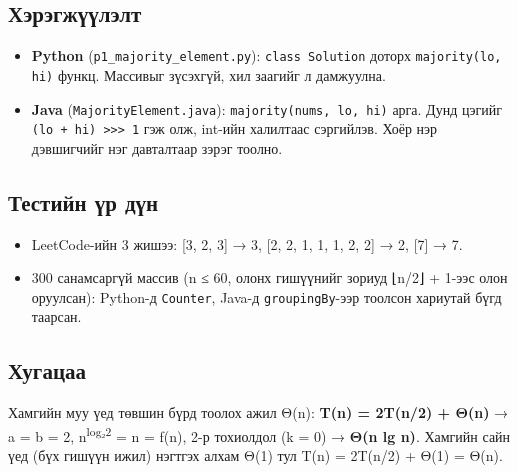 \documentclass[11pt,a4paper]{article}
\begin{document}
\subsection{Хэрэгжүүлэлт}
\begin{itemize}
\item \textbf{Python} (\texttt{p1\_\allowbreak{}majority\_\allowbreak{}element.\allowbreak{}py}): \texttt{class Solution} доторх \texttt{majority(lo, hi)} функц. Массивыг зүсэхгүй, хил заагийг л дамжуулна.
\item \textbf{Java} (\texttt{MajorityElement.\allowbreak{}java}): \texttt{majority(nums, lo, hi)} арга. Дунд цэгийг \texttt{(lo + hi) >>> 1} гэж олж, int-ийн халилтаас сэргийлэв. Хоёр нэр дэвшигчийг нэг давталтаар зэрэг тоолно.
\end{itemize}

\subsection{Тестийн үр дүн}
\begin{itemize}
\item LeetCode-ийн 3 жишээ: [3, 2, 3] → 3, [2, 2, 1, 1, 1, 2, 2] → 2, [7] → 7.
\item 300 санамсаргүй массив (n ≤ 60, олонх гишүүнийг зориуд ⌊n/2⌋ + 1-ээс олон оруулсан): Python-д \texttt{Counter}, Java-д \texttt{groupingBy}-ээр тоолсон хариутай бүгд таарсан.
\end{itemize}

\subsection{Хугацаа}
Хамгийн муу үед төвшин бүрд тоолох ажил Θ(n): \textbf{T(n) = 2T(n/2) + Θ(n)} → a = b = 2, n\textsuperscript{log₂2} = n = f(n), 2-р тохиолдол (k = 0) → \textbf{Θ(n lg n)}. Хамгийн сайн үед (бүх гишүүн ижил) нэгтгэх алхам Θ(1) тул T(n) = 2T(n/2) + Θ(1) = Θ(n).
\end{document}

